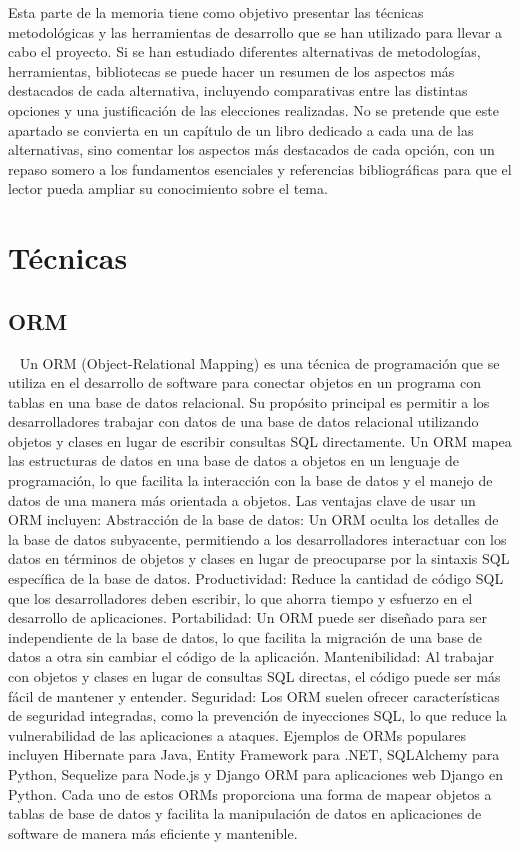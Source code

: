
Esta parte de la memoria tiene como objetivo presentar las técnicas metodológicas y las herramientas de desarrollo que se han utilizado para llevar a cabo el proyecto. Si se han estudiado diferentes alternativas de metodologías, herramientas, bibliotecas se puede hacer un resumen de los aspectos más destacados de cada alternativa, incluyendo comparativas entre las distintas opciones y una justificación de las elecciones realizadas. 
No se pretende que este apartado se convierta en un capítulo de un 
libro dedicado a cada una de las alternativas, sino comentar los aspectos 
más destacados de cada opción, con un repaso somero a los fundamentos 
esenciales y referencias bibliográficas para que el lector pueda ampliar 
su conocimiento sobre el tema.

\section{Técnicas}

\subsection{ORM}~\cite{fowler2012patterns}
Un ORM (Object-Relational Mapping) es una técnica de programación que se utiliza en el desarrollo de software para conectar objetos en un programa con tablas en una base de datos relacional. Su propósito principal es permitir a los desarrolladores trabajar con datos de una base de datos relacional utilizando objetos y clases en lugar de escribir consultas SQL directamente. Un ORM mapea las estructuras de datos en una base de datos a objetos en un lenguaje de programación, lo que facilita la interacción con la base de datos y el manejo de datos de una manera más orientada a objetos.
Las ventajas clave de usar un ORM incluyen:
Abstracción de la base de datos: Un ORM oculta los detalles de la base de datos subyacente, permitiendo a los desarrolladores interactuar con los datos en términos de objetos y clases en lugar de preocuparse por la sintaxis SQL específica de la base de datos.
Productividad: Reduce la cantidad de código SQL que los desarrolladores deben escribir, lo que ahorra tiempo y esfuerzo en el desarrollo de aplicaciones.
Portabilidad: Un ORM puede ser diseñado para ser independiente de la base de datos, lo que facilita la migración de una base de datos a otra sin cambiar el código de la aplicación.
Mantenibilidad: Al trabajar con objetos y clases en lugar de consultas SQL directas, el código puede ser más fácil de mantener y entender.
Seguridad: Los ORM suelen ofrecer características de seguridad integradas, como la prevención de inyecciones SQL, lo que reduce la vulnerabilidad de las aplicaciones a ataques.
Ejemplos de ORMs populares incluyen Hibernate para Java, Entity Framework para .NET, SQLAlchemy para Python, Sequelize para Node.js y Django ORM para aplicaciones web Django en Python. Cada uno de estos ORMs proporciona una forma de mapear objetos a tablas de base de datos y facilita la manipulación de datos en aplicaciones de software de manera más eficiente y mantenible.

